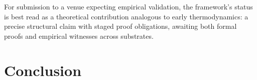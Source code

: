 \documentclass[journal]{IEEEtran}
\theoremstyle{plain}
\theoremstyle{definition}
\theoremstyle{plain}
\begin{document}
For submission to a venue expecting empirical validation, the
framework's status is best read as a theoretical contribution
analogous to early thermodynamics: a precise structural claim with
staged proof obligations, awaiting both formal proofs and empirical
witnesses across substrates.

\section{Conclusion}



\end{document}
